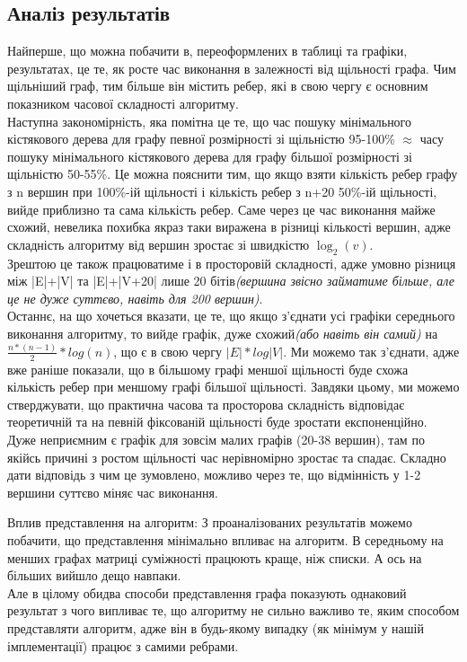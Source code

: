 \documentclass[titlepage, a4paper]{article}
\begin{document}
\subsection{Аналіз результатів}
Найперше, що можна побачити в, переоформлених в таблиці та графіки, результатах, це те, як росте час виконання в залежності від щільності графа. Чим щільніший граф, тим більше він містить ребер, які в свою чергу є основним показником часової складності алгоритму.\\
Наступна закономірність, яка помітна це те, що час пошуку мінімального кістякового дерева для графу певної розмірності зі щільністю 95-100\% $\approx$ часу пошуку мінімального кістякового дерева для графу більшої розмірності зі щільністю 50-55\%. Це можна пояснити тим, що якщо взяти кількість ребер графу з n вершин при 100\%-ій щільності і кількість ребер з n+20 50\%-ій щільності, вийде приблизно та сама кількість ребер. Саме через це час виконання майже схожий, невелика похибка якраз таки виражена в різниці кількості вершин, адже складність алгоритму від вершин зростає зі швидкістю $\log_{2}(v)$.\\
Зрештою це також працюватиме і в просторовій складності, адже умовно різниця між |E|+|V| та |E|+|V+20| лише 20 бітів\textit{(вершина звісно займатиме більше, але це не дуже суттєво, навіть для 200 вершин)}.\\
Останнє, на що хочеться вказати, це те, що якщо з'єднати усі графіки середнього виконання алгоритму, то вийде графік, дуже схожий\textit{(або навіть він самий)} на $\frac{n*(n-1)}{2}*log(n)$, що є в свою чергу $|E|*log|V|$. Ми можемо так з'єднати, адже вже раніше показали, що в більшому графі меншої щільності буде схожа кількість ребер при меншому графі більшої щільності. Завдяки цьому, ми можемо стверджувати, що практична часова та просторова складність відповідає теоретичній та на певній фіксованій щільності буде зростати експоненційно.\\

Дуже неприємним є графік для зовсім малих графів (20-38 вершин), там по якійсь причині з ростом щільності час нерівномірно зростає та спадає. Складно дати відповідь з чим це зумовлено, можливо через те, що відмінність у 1-2 вершини суттєво міняє час виконання.

Вплив представлення на алгоритм: З проаналізованих результатів можемо побачити, що представлення мінімально впливає на алгоритм.
В середньому на менших графах матриці суміжності працюють краще, ніж списки. А ось на більших вийшло дещо навпаки.\\
Але в цілому обидва способи представлення графа показують однаковий результат з чого випливає те, що алгоритму не сильно важливо те, яким способом представляти алгоритм, адже він в будь-якому випадку (як мінімум у нашій імплементації) працює з самими ребрами.
\end{document}
